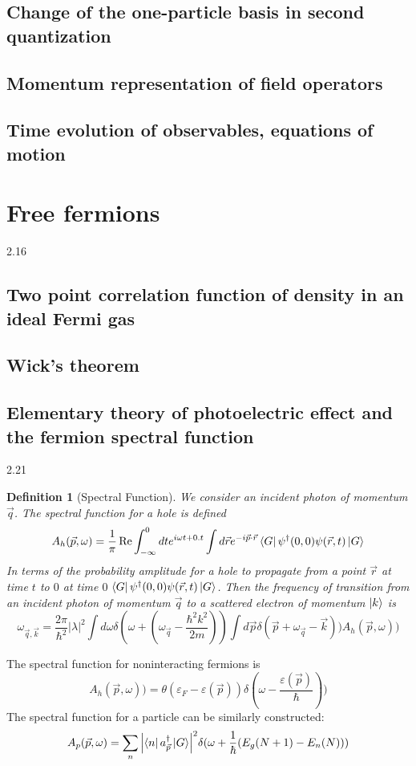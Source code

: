 \documentclass[10pt]{article}
\newtheorem*{defn}{Definition}
\begin{document}
\subsection{Change of the one-particle basis in second quantization}
\subsection{Momentum representation of field operators}
\subsection{Time evolution of observables, equations of motion}
\section{Free fermions}
2.16
\subsection{Two point correlation  function of density in an ideal Fermi gas}
\subsection{Wick's theorem}
\subsection{Elementary theory of photoelectric effect and the fermion spectral function}
2.21\\
\begin{defn}[Spectral Function]
    We consider an incident photon of momentum $\vec q$. The spectral function for a hole is defined
    $$
    A_h(\vec p, \omega) = \frac{1}{\pi}\Re \int_{-\infty}^0 dt e^{i\omega t + 0.t} \int d\vec r e^{-i\vec p \cdot \vec r} \bra{G} \psi^\dagger(0,0)\psi(\vec r, t)\ket{G}
    $$
    In terms of the probability amplitude for a hole to propagate from a point $\vec r$ at time $t$ to $0$ at time $0$ $\bra G \psi^\dagger(0,0) \psi(\vec r, t)\ket{G}$. Then the frequency of transition from an incident photon of momentum $\vec q$ to a scattered electron of momentum $\ket k$ is
    $$
    \omega_{\vec q, \vec k} = \frac{2\pi}{\hbar^2}|\lambda|^2 \int d\omega\delta(\omega + (\omega_{\vec q}-\frac{\hbar^2k^2}{2m}))\int d\vec p \delta(\vec p +\omega_{\vec q}-\vec k)) A_h(\vec p, \omega))
$$
\end{defn}
The spectral function for noninteracting fermions is
$$
A_h(\vec p, \omega)) = \theta(\varepsilon_F - \varepsilon(\vec p))\delta(\omega-\frac{\varepsilon(\vec p)}{\hbar}))
$$
The spectral function for a particle can be similarly constructed:
$$
A_p(\vec p, \omega) = \sum_n\qty|\bra{n}a_{\vec p}^\dagger \ket{G}|^2 \delta(\omega + \frac{1}{\hbar}(E_g(N+1)-E_n(N)))
$$
\end{document}
